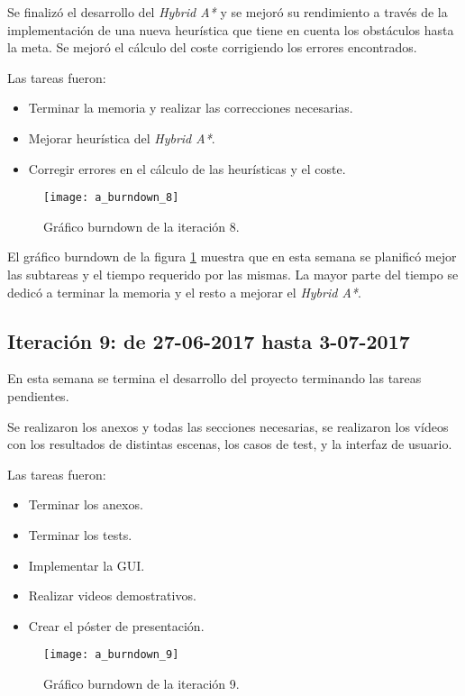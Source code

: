 Se finalizó el desarrollo del \textit{Hybrid A*} y se mejoró su rendimiento a través de la implementación de una nueva heurística que tiene en cuenta los obstáculos hasta la meta. Se mejoró el cálculo del coste corrigiendo los errores encontrados.

Las tareas fueron:
\begin{itemize}
\item Terminar la memoria y realizar las correcciones necesarias.
\item Mejorar heurística del \textit{Hybrid A*}.
\item Corregir errores en el cálculo de las heurísticas y el coste.
\end{itemize}

\begin{figure}[htpb]
    \centering
    \texttt{[image: a\_burndown\_8]}
    \caption[Gráfico burndown de la iteración 8]{Gráfico burndown de la iteración 8.}
    \label{fig:burndown8}
\end{figure}

El gráfico burndown de la figura \ref{fig:burndown8} muestra que en esta semana se planificó mejor las subtareas y el tiempo requerido por las mismas. La mayor parte del tiempo se dedicó a terminar la memoria y el resto a mejorar el \textit{Hybrid A*}.

\newpage
\subsection{Iteración 9: de 27-06-2017 hasta 3-07-2017}
En esta semana se termina el desarrollo del proyecto terminando las tareas pendientes.

Se realizaron los anexos y todas las secciones necesarias, se realizaron los vídeos con los resultados de distintas escenas, los casos de test, y la interfaz de usuario.

Las tareas fueron:
\begin{itemize}
\item Terminar los anexos.
\item Terminar los tests.
\item Implementar la GUI.
\item Realizar videos demostrativos.
\item Crear el póster de presentación.
\end{itemize}

\begin{figure}[htpb]
    \centering
    \texttt{[image: a\_burndown\_9]}
    \caption[Gráfico burndown de la iteración 9]{Gráfico burndown de la iteración 9.}
    \label{fig:burndown9}
\end{figure}

